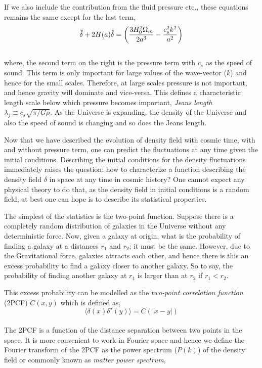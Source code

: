\documentclass[
  11pt,
  twoside,
  openright,
  titlepage,
  headings=optiontoheadandtoc
]{scrbook}
\begin{document}
If we also include the contribution from the fluid pressure etc., these equations remains
the same except for the last term,
\begin{equation}
\centering
	\ddot{\tilde{\delta}} + 2H(a) \dot{\tilde{\delta}} = 
					\left( \dfrac{3H_0^2\Omega_m}{2a^3} - \dfrac{c_s^2k^2}{a^2}   \right)
\end{equation}
\\
where, the second term on the right is the pressure term with $c_s$ as the speed of sound. 
This term is only important
for large values of the wave-vector ($k$) and hence for the small scales. Therefore, at
large scales pressure is not important, and hence gravity will dominate and vice-versa. 
This defines a characteristic length scale below which pressure becomes important, 
{\it Jeans length} $\lambda_j \equiv c_s \sqrt{\pi/G\rho}$. As the Universe is 
expanding, the density of the Universe and also the speed of sound is changing 
and so does the Jeans length.

Now that we have described the evolution of density field with cosmic time, with and
without pressure term, one can predict the fluctuations at any time given the initial
conditions. Describing the initial conditions for the density fluctuations immediately
raises the question: how to characterize a function describing the density field $\delta$
in space at any time in cosmic history? One cannot expect any physical theory to 
do that, as the density field
in initial conditions is a random field, at best one can hope is to describe its
statistical properties. 

The simplest of the statistics is the two-point function. Suppose there is a 
completely random distribution of galaxies in the Universe without any deterministic 
force. Now, given a galaxy at origin, what is the probability of finding a galaxy at a 
distances $r_1$ and $r_2$; it must be the same. 
However, due to the Gravitational force, galaxies attracts each other, and hence 
there is this an excess probability to find a galaxy closer to another galaxy. So to say, 
the probability of finding another galaxy at $r_1$ is larger than
at $r_2$ if $r_1<r_2$.

This excess probability can be modelled as the {\it two-point correlation function} (2PCF) 
$C(x,y)$ which is defined as, 
\begin{equation}
	\langle \delta(x) \delta^{\star}(y) \rangle = C(|x-y|)
\end{equation}
\\
The 2PCF is a function of the distance
separation between two points in the space. It is more convenient to work in 
Fourier space and hence we define the Fourier transform of the 2PCF as the 
power spectrum ($P(k)$) of the density field or commonly known as
{\it matter power spectrum},
\end{document}
